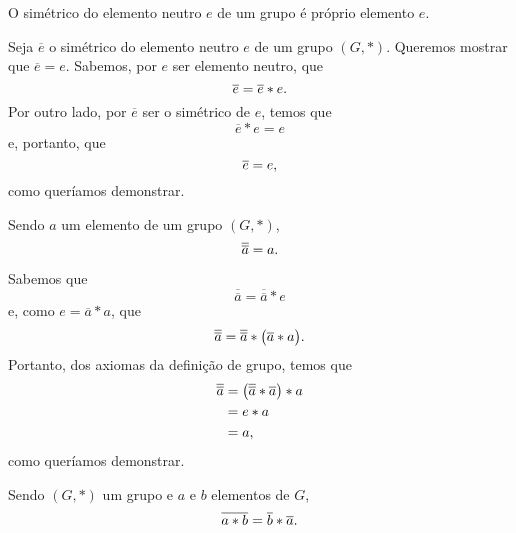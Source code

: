 \begin{Propr}
  O simétrico do elemento neutro $e$ de um grupo é próprio elemento
  $e$.
\end{Propr}

\begin{dem}
  Seja $\overline{e}$ o simétrico do elemento neutro $e$ de um grupo
  $(G,\ast )$. Queremos mostrar que $\overline{e}=e$. Sabemos, por $e$ ser
  elemento neutro, que
  \begin{equation*}
    \overline{e} = \overline{e}\ast e\mathrm{.}
  \end{equation*}
  Por outro lado, por $\overline{e}$ ser o simétrico de $e$, temos que
  \begin{equation*}
    \overline{e}\ast e = e
  \end{equation*}
  e, portanto, que
  \begin{equation*}
    \overline{e} = e\mathrm{,}
  \end{equation*}
  como queríamos demonstrar.
\end{dem}

\begin{Propr}
  Sendo $a$ um elemento de um grupo $(G,\ast )$,
  \begin{equation*}
    \overline{\overline{a}} = a\mathrm{.}
  \end{equation*}
\end{Propr}

\begin{dem}
  Sabemos que
  \begin{equation*}
    \overline{\overline{a}} = \overline{\overline{a}}\ast e
  \end{equation*}
  e, como $e = \overline{a}\ast a$, que
  \begin{equation*}
    \overline{\overline{a}} =
      \overline{\overline{a}}\ast \bigl(\overline{a}\ast a\bigr)\mathrm{.}
  \end{equation*}
  Portanto, dos axiomas da definição de grupo, temos que
  \begin{equation*}
    \begin{aligned}
      \overline{\overline{a}}
        &= \bigl(\overline{\overline{a}}\ast \overline{a}\bigr)\ast a \\
        &= e\ast a \\
        &= a\mathrm{,}
    \end{aligned}
  \end{equation*}
  como queríamos demonstrar.
\end{dem}

\begin{Propr}\label{psmorg}
  Sendo $(G,\ast )$ um grupo e $a$ e $b$ elementos de $G$,
  \begin{equation*}
    \overline{a\ast b} = \overline{b}\ast \overline{a}\mathrm{.}
  \end{equation*}
\end{Propr}

